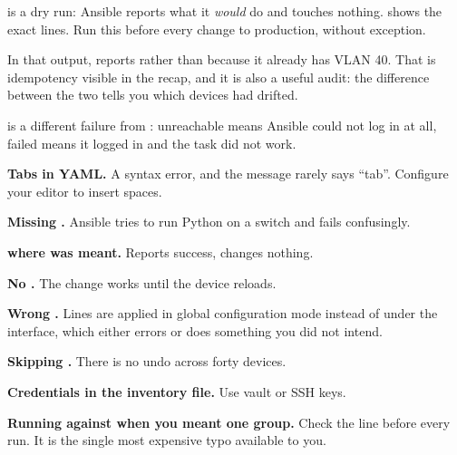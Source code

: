 \begin{conceptbox}
 is a dry run: Ansible reports what it \emph{would} do and touches
nothing.  shows the exact lines. Run this before every change to
production, without exception.

In that output,  reports  rather than  because it
already has VLAN 40. That is idempotency visible in the recap, and it is also a
useful audit: the difference between the two tells you which devices had drifted.

 is a different failure from : unreachable means
Ansible could not log in at all, failed means it logged in and the task did not
work.
\end{conceptbox}

\begin{pitfall}
\begin{tight}
  \item \textbf{Tabs in YAML.} A syntax error, and the message rarely says
        ``tab''. Configure your editor to insert spaces.
  \item \textbf{Missing .} Ansible tries to
        run Python on a switch and fails confusingly.
  \item \textbf{ where  was meant.} Reports
        success, changes nothing.
  \item \textbf{No .} The change works until the device reloads.
  \item \textbf{Wrong .} Lines are applied in global configuration
        mode instead of under the interface, which either errors or does
        something you did not intend.
  \item \textbf{Skipping .} There is no undo across forty devices.
  \item \textbf{Credentials in the inventory file.} Use vault or SSH keys.
  \item \textbf{Running against  when you meant one group.} Check the
         line before every run. It is the single most expensive typo
        available to you.
\end{tight}
\end{pitfall}


